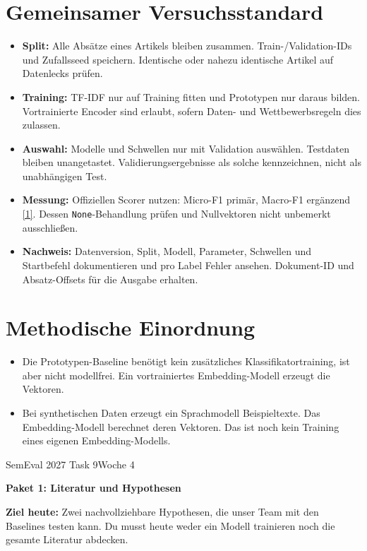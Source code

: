 \documentclass[10pt,a4paper]{article}
\renewcommand{\normalsize}{\fontsize{9.5}{12}\selectfont}
\newcommand{\followuptitle}[1]{%
  {\small SemEval 2027 Task 9\hfill Woche 4\par}%
  \vspace{6pt}%
  {\fontsize{16}{19}\selectfont\bfseries #1\par}%
  \vspace{8pt}%
}
\begin{document}
\section{Gemeinsamer Versuchsstandard}
\begin{itemize}[itemsep=2pt,topsep=2pt]
  \item \textbf{Split:} Alle Absätze eines Artikels bleiben zusammen. Train-/Validation-IDs
        und Zufallsseed speichern. Identische oder nahezu identische Artikel auf Datenlecks prüfen.
  \item \textbf{Training:} TF-IDF nur auf Training fitten und Prototypen nur daraus bilden.
        Vortrainierte Encoder sind erlaubt, sofern Daten- und Wettbewerbsregeln dies zulassen.
  \item \textbf{Auswahl:} Modelle und Schwellen nur mit Validation auswählen. Testdaten bleiben
        unangetastet. Validierungsergebnisse als solche kennzeichnen, nicht als unabhängigen Test.
  \item \textbf{Messung:} Offiziellen Scorer nutzen: Micro-F1 primär, Macro-F1 ergänzend \hyperlink{quelle-task}{[1]}.
        Dessen \texttt{None}-Behandlung prüfen und Nullvektoren nicht unbemerkt ausschließen.
  \item \textbf{Nachweis:} Datenversion, Split, Modell, Parameter, Schwellen und Startbefehl
        dokumentieren und pro Label Fehler ansehen. Dokument-ID und Absatz-Offsets für die Ausgabe erhalten.
\end{itemize}

\section{Methodische Einordnung}
\begin{itemize}[itemsep=3pt,topsep=2pt]
  \item Die Prototypen-Baseline benötigt kein zusätzliches Klassifikatortraining, ist aber
        nicht modellfrei. Ein vortrainiertes Embedding-Modell erzeugt die Vektoren.
  \item Bei synthetischen Daten erzeugt ein Sprachmodell Beispieltexte. Das Embedding-Modell
        berechnet deren Vektoren. Das ist noch kein Training eines eigenen Embedding-Modells.
\end{itemize}

\newpage
\normalsize
\hypertarget{plan-literatur}{}
\followuptitle{Paket 1: Literatur und Hypothesen}
\textbf{Ziel heute:} Zwei nachvollziehbare Hypothesen, die unser Team mit den Baselines testen kann.
Du musst heute weder ein Modell trainieren noch die gesamte Literatur abdecken.
\end{document}

